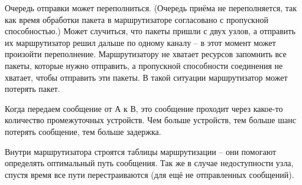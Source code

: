 Очередь отправки может переполниться. (Очередь приёма не переполняется, так как время обработки пакета в маршрутизаторе согласовано с пропускной способностью.) Может случиться, что пакеты пришли с двух узлов, а отправить их маршрутизатор решил дальше по одному каналу -- в этот момент может произойти переполнение.
Маршрутизатору не хватает ресурсов запомнить все пакеты, которые нужно отправить, а пропускной способности соединения не хватает, чтобы отправить эти пакеты. В такой ситуации маршрутизатор может потерять пакет.

Когда передаем сообщение от А к В, это сообщение проходит через какое-то количество промежуточных устройств. Чем больше устройств, тем больше шанс потерять сообщение, тем больше задержка.

Внутри маршрутизатора строятся таблицы маршрутизации -- они помогают определять оптимальный путь сообщения. Так же в случае недоступности узла, спустя время все пути перестраиваются (для ещё не отправленных сообщений).